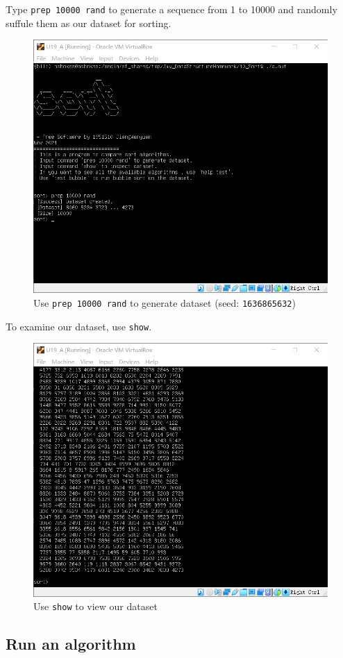 \documentclass[cn,black,12pt,normal]{elegantnote}
\begin{document}
Type \lstinline{prep 10000 rand} to generate a sequence from 1 to 10000 and randomly suffule them as our dataset for sorting.

\begin{figure}[H]
    \centering
    \includegraphics[width=0.7\linewidth]{image/sort_02.jpg}
    \caption{Use \lstinline{prep 10000 rand} to generate dataset (seed: \lstinline{1636865632})}
\end{figure}

To examine our dataset, use \lstinline{show}.

\begin{figure}[H]
    \centering
    \includegraphics[width=0.7\linewidth]{image/sort_03.jpg}
    \caption{Use \lstinline{show} to view our dataset}
\end{figure}

\subsection{Run an algorithm}
\end{document}
